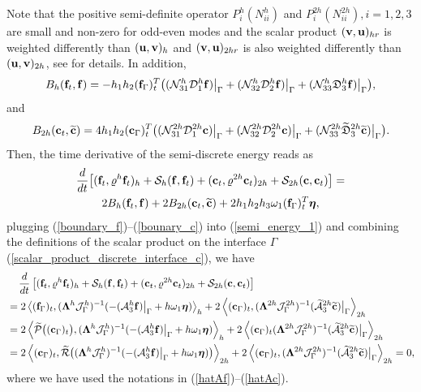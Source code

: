 Note that the positive semi-definite operator $P_i^{h}(N_{ii}^{h})$ and $P_i^{2h}(N_{ii}^{2h}), i = 1,2,3$ are small and non-zero for odd-even modes and the scalar product $({\bf v}, {\bf u})_{hr}$ is weighted differently than $({\bf u}, {\bf v})_h$ and $({\bf v}, {\bf u})_{2hr}$ is also weighted differently than $({\bf u}, {\bf v})_{2h}$, see \cite{sjogreen2012fourth, petersson2015wave} for details. In addition,
\begin{equation}\label{boundary_f}
B_h ({\bf f}_t,{\bf f}) = -h_1h_2({\bf f}_{\Gamma})_t^T\big((\mathcal{N}_{31}^h{\mathcal D}_1^h {\bf f})\big|_{\Gamma}+ (\mathcal{N}_{32}^h\mathcal{D}_2^h{\bf f})\big|_{\Gamma}+(\mathcal{N}_{33}^h\mathfrak{D}_3^h{\bf f})\big|_{\Gamma}\big),
\end{equation}
and
\begin{equation}\label{bounary_c}
B_{2h} ({\bf c}_t,\wt{\bf c}) = 4h_1h_2({\bf c}_{\Gamma})_t^T\big((\mathcal{N}_{31}^{2h}\mathcal{D}_1^{2h}{\bf c})\big|_{\Gamma}+ (\mathcal{N}_{32}^{2h}\mathcal{D}_2^{2h}{\bf c})\big|_{\Gamma}+(\mathcal{N}_{33}^{2h}\wt{\mathfrak{D}}_3^{2h}\wt{{\bf c}})\big|_{\Gamma}\big).
\end{equation}
Then, the time derivative of the semi-discrete energy reads as
\begin{multline}\label{semi_energy_1}
\frac{d}{dt}\big[({\bf f}_t,\varrho^h {\bf f}_t)_h + \mathcal{S}_{h}({\bf f},{\bf f}_t) + ({\bf c}_t,\varrho^{2h} {\bf c}_t)_{2h} + \mathcal{S}_{2h}({\bf c},{\bf c}_t) \big]  = \\
2B_{h}({\bf f}_t,{\bf f}) + 2B_{2h}({\bf c}_t,\wt{\bf c}) + 2h_1h_2h_3\omega_1({\bf f}_\Gamma)_t^T{\bm \eta},
\end{multline}
plugging (\ref{boundary_f})--(\ref{bounary_c}) into (\ref{semi_energy_1}) and combining the definitions of the scalar product on the interface $\Gamma$ (\ref{scalar_product_discrete_interface_c}), we have
\begin{align*}\label{semi_energy_2}
&\hspace{0.4cm}\frac{d}{dt}\left[({\bf f}_t,\varrho^h {\bf f}_t)_{h} + \mathcal{S}_{h}({\bf f},{\bf f}_t) + ({\bf c}_t,\varrho^{2h} {\bf c}_t)_{2h} + \mathcal{S}_{2h}({\bf c},{\bf c}_t) \right]   \nonumber\\
& = 2\left<({\bf f}_\Gamma)_t,(\bm{\Lambda}^{h}\mathcal{J}^h_\Gamma)^{-1}(-(\mathcal{A}_3^h{\bf f})\big|_\Gamma+h\omega_1{\bm \eta})\right>_{h}+ 2\left<({\bf c}_\Gamma)_t,(\bm{\Lambda}^{2h}\mathcal{J}^{2h}_\Gamma)^{-1}(\wt{\mathcal{A}}_3^{2h}\wt{\bf c})\big|_\Gamma\right>_{2h} \nonumber\\
& = 2\left<\wt{\mathcal{P}}\big(({\bf c}_\Gamma)_t\big),(\bm{\Lambda}^{h}\mathcal{J}^h_\Gamma)^{-1}(-(\mathcal{A}_3^h{\bf f})\big|_\Gamma+h\omega_1{\bm \eta})\right>_{h}+ 2\left<({\bf c}_\Gamma)_t(\bm{\Lambda}^{2h}\mathcal{J}^{2h}_\Gamma)^{-1}(\wt{\mathcal{A}}_3^{2h}\wt{\bf c})\big|_\Gamma\right>_{2h} \nonumber\\
& = 2\left<({\bf c}_\Gamma)_t,\wt{\mathcal{R}}\big((\bm{\Lambda}^{h}\mathcal{J}^h_\Gamma)^{-1}(-(\mathcal{A}_3^h{\bf f})\big|_\Gamma+h\omega_1{\bm \eta})\big)\right>_{2h}+ 2\left<({\bf c}_\Gamma)_t,(\bm{\Lambda}^{2h}\mathcal{J}^{2h}_\Gamma)^{-1}(\wt{\mathcal{A}}_3^{2h}\wt{\bf c})\big|_\Gamma\right>_{2h} = 0,
\end{align*}
where we have used the notations in (\ref{hatAf})--(\ref{hatAc}).
